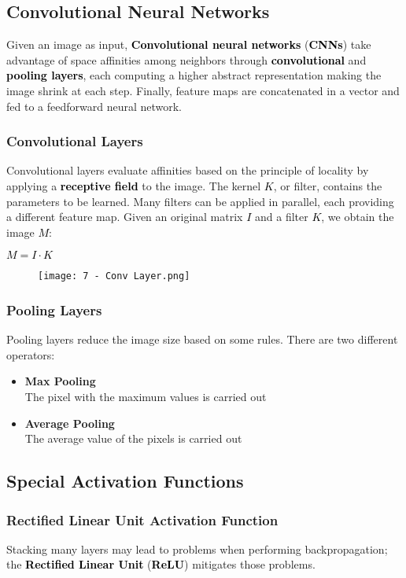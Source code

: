 \documentclass{article}
\newcommand{\bb}[1]{\textcolor{black}{\textbf{#1}}}
\newcommand{\rr}[1]{\textcolor{black}{#1}}
\newcommand{\cc}[1]{\begin{center}\textcolor{black}{#1}\end{center}}
\newcommand{\concept}[1]{\textbf{#1}\vspace{0.2cm}\\}
\begin{document}
\subsection{Convolutional Neural Networks}
Given an image as input, \bb{Convolutional neural networks} (\bb{CNNs}) take advantage of space affinities among neighbors through \bb{convolutional} and \bb{pooling layers}, each computing a higher abstract representation making the image shrink at each step. Finally, feature maps are concatenated in a vector and fed to a feedforward neural network.
\subsubsection{Convolutional Layers}
Convolutional layers evaluate affinities based on the principle of locality by applying a \bb{receptive field} to the image. The kernel \rr{$K$}, or filter, contains the parameters to be learned. Many filters can be applied in parallel, each providing a different feature map. Given an original matrix \rr{$I$} and a filter \rr{$K$}, we obtain the image \rr{$M$}:
\cc{$M = I \cdot K$}
\begin{figure}[H]
    \centering
    \texttt{[image: 7 - Conv Layer.png]}
\end{figure}
\subsubsection{Pooling Layers}
Pooling layers reduce the image size based on some rules. There are two different operators:
\begin{itemize}
    \item \concept{Max Pooling}
        The pixel with the maximum values is carried out
    \item \concept{Average Pooling}
        The average value of the pixels is carried out
\end{itemize}

\subsection{Special Activation Functions}
\subsubsection{Rectified Linear Unit Activation Function}
Stacking many layers may lead to problems when performing backpropagation; the \bb{Rectified Linear Unit} (\bb{ReLU}) mitigates those problems.
\end{document}
